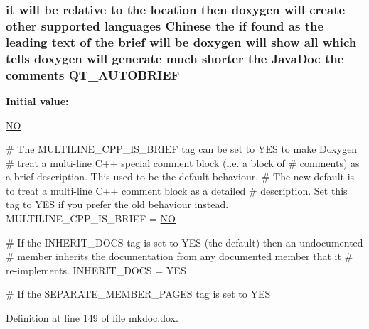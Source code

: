 \hypertarget{mkdoc_8dox_ac0b206976e7e9c2197ff6f4a6104ed56}{
\subsubsection[{Q\-T\-\_\-\-A\-U\-T\-O\-B\-R\-I\-E\-F}]{\setlength{\rightskip}{0pt plus 5cm}it will be relative to the location then doxygen will create other supported languages {\bf Chinese} the if found as the leading text of the brief will be doxygen will show all which tells doxygen will generate much shorter the Java\-Doc the comments Q\-T\-\_\-\-A\-U\-T\-O\-B\-R\-I\-E\-F}}\label{mkdoc_8dox_ac0b206976e7e9c2197ff6f4a6104ed56}
{\bfseries Initial value\-:}
\begin{DoxyCode}
 \hyperlink{mkdoc_8dox_a0f6a46245280dc38baf9600906aa1393}{NO}

\textcolor{preprocessor}{# The MULTILINE\_CPP\_IS\_BRIEF tag can be set to YES to make Doxygen }
\textcolor{preprocessor}{}\textcolor{preprocessor}{# treat a multi-line C++ special comment block (i.e. a block of }
\textcolor{preprocessor}{}\textcolor{preprocessor}{# comments) as a brief description. This used to be the default behaviour. }
\textcolor{preprocessor}{}\textcolor{preprocessor}{# The new default is to treat a multi-line C++ comment block as a detailed }
\textcolor{preprocessor}{}\textcolor{preprocessor}{# description. Set this tag to YES if you prefer the old behaviour instead.}
\textcolor{preprocessor}{}
MULTILINE\_CPP\_IS\_BRIEF = \hyperlink{mkdoc_8dox_a0f6a46245280dc38baf9600906aa1393}{NO}

\textcolor{preprocessor}{# If the INHERIT\_DOCS tag is set to YES (the default) then an undocumented }
\textcolor{preprocessor}{}\textcolor{preprocessor}{# member inherits the documentation from any documented member that it }
\textcolor{preprocessor}{}\textcolor{preprocessor}{# re-implements.}
\textcolor{preprocessor}{}
INHERIT\_DOCS           = YES

\textcolor{preprocessor}{# If the SEPARATE\_MEMBER\_PAGES tag is set to YES}
\end{DoxyCode}


Definition at line \hyperlink{mkdoc_8dox_source_l00149}{149} of file \hyperlink{mkdoc_8dox_source}{mkdoc.\-dox}.

